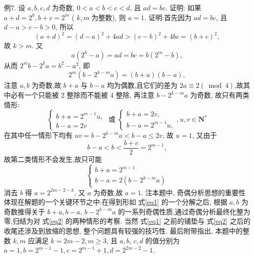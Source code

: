 例7. 设 $a, b, c, d$ 为奇数, $0<a<b<c<d$, 且 $a d=b c$. 证明: 如果 $a+d=2^k, b+c=2^m$ ( $k, m$ 为整数), 则 $a=1$. 
证明:首先因为 $a d=b c$, 且 $d-a>c-b>0$, 所以
$$
(a+d)^2=(d-a)^2+4 a d>(c-b)^2+4 b c=(b+c)^2,
$$
故 $k>m$. 又
$$
a\left(2^k-a\right)=a d=b c=b\left(2^m-b\right),
$$
从而 $2^m b-2^k a=b^2-a^2$, 即
$$
2^m\left(b-2^{k-m} a\right)=(b+a)(b-a), \label{eq1}
$$
注意 $a, b$ 为奇数,故 $b+a$ 与 $b-a$ 均为偶数,且它们的差为 $2 a \equiv 2(\bmod 4)$,故其中必有一个只能被 2 整除而不能被 4 整除, 再注意 $b-2^{k-m} a$ 为奇数, 故只有两类情形:
$$
\left\{\begin{array} { l } 
{ b + a = 2 ^ { m - 1 } u , } \\
{ b - a = 2 v }
\end{array} \text { 或 } \left\{\begin{array}{l}
b+a=2 v, \\
b-a=2^{m-1} u,
\end{array}, u, v \in \mathbf{N}^*\right.\right. \label{eq2}
$$
在其中任一情形下均有 $u v=b-2^{k-m} a<b-a \leqslant 2 v$, 故 $u=1$, 又由于
$$
b-a<b<\frac{b+c}{2}=2^{m-1},
$$
故第二类情形不会发生,故只可能
$$
\left\{\begin{array}{l}
b+a=2^{m-1} \\
b-a=2\left(b-2^{k-m} a\right)
\end{array}\right.
$$
消去 $b$ 得 $a=2^{2 m-2-k}$, 又 $a$ 为奇数,故 $a=1$.
注本题中, 奇偶分析思想的重要性体现在解题的一个关键环节之中:在得到形如 式\ref{eq1} 的一个分解之后, 根据 $a, b$ 为奇数推得关于 $b+a, b-a$, $b-2^{k-m} a$ 的一系列奇偶性质,通过奇偶分析最终化整为零,归结为对 式\ref{eq2} 的两种情形的考察.
当然 式\ref{eq1} 之前的铺垫与 式\ref{eq2} 之后的收尾还涉及到放缩的思想, 整个问题具有较强的技巧性.
最后附带指出, 本题中的整数 $k, m$ 应满足 $k=2 m-2, m \geqslant 3$, 且 $a, b$, $c, d$ 的值分别为 $a=1, b=2^{m-1}-1, c=2^{m-1}+1, d=2^{2 m-2}-1$.



